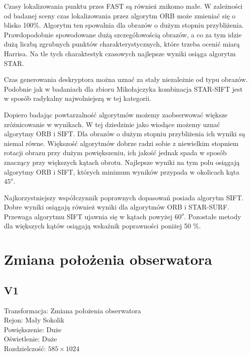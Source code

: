 Czasy lokalizowania punktu przes FAST są również znikomo małe. W zależności od badanej sceny czas lokalizowania przez algorytm ORB może zmieniać się o blisko 100\%. Algorytm ten spowalnia dla obrazów o dużym stopniu przybliżenia. Prawdopodobnie spowodowane dużą szczegółowością obrazów, a co za tym idzie dużą liczbą zgrubnych punktów charakterystycznych, które trzeba ocenić miarą Harrisa. Na tle tych charaktestyk czasowych najlepsze wyniki osiąga algorytm STAR.

Czas generowania deskryptora można uznać za stały niezależnie od typu obrazów. Podobnie jak w badaniach dla zbioru Mikołajczyka kombinacja STAR-SIFT jest w sposób radykalny najwolniejszą w tej kategorii.

Dopiero badając powtarzalność algorytmów możemy zaobserwować większe zróżnicowanie w wynikach. W tej dziedzinie jako wiodące możemy uznać algorytmy ORB i SIFT. Dla obrazów o dużym stopniu przybliżenia ich wyniki są niemal równe. Większość algorytmów dobrze radzi sobie z niewielkim stopniem rotacji obrazu przy dużym powiększeniu, ich jakość jednak spada w sposób znaczący przy większych kątach obrotu. Najlepsze wyniki na tym polu osiągają algorytmy ORB i SIFT, których minimum wyników przypada w okolicach kąta $45^o$.

Najkorzystniejszy współczynnik poprawnych dopasowań posiada algorytm SIFT. Dobre wyniki osiągają również wyniki dla algorytmów ORB i STAR-SURF. Przewaga algorytmu SIFT ujawnia się w kątach powyżej $60^o$. Pozostałe metody dla większych kątów osiągają wskaźnik poprawności poniżej 50 \%.





\FloatBarrier
\newpage
\section{Zmiana położenia obserwatora}
\FloatBarrier
\subsection{V1}
Transformacja: Zmiana położenia obserwatora\\
Rejon: Mały Sokolik\\
Powiększenie: Duże\\
Oświetlenie: Duże\\
Rozdzielczość: $585 \times 1024$

